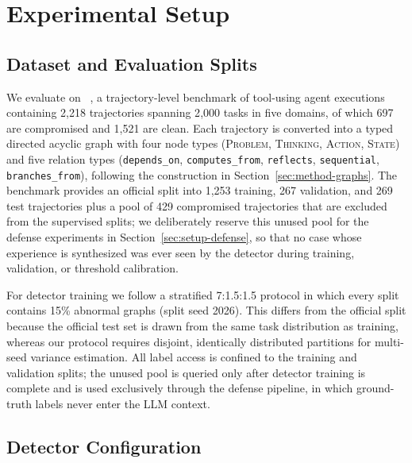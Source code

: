 \section{Experimental Setup}
\label{sec:setup}

\subsection{Dataset and Evaluation Splits}
\label{sec:setup-data}

We evaluate on \tool{}~\cite{ma2026autodojo}, a trajectory-level benchmark of tool-using agent executions containing 2{,}218 trajectories spanning 2{,}000 tasks in five domains, of which 697 are compromised and 1{,}521 are clean. Each trajectory is converted into a typed directed acyclic graph with four node types (\textsc{Problem}, \textsc{Thinking}, \textsc{Action}, \textsc{State}) and five relation types (\texttt{depends\_on}, \texttt{computes\_from}, \texttt{reflects}, \texttt{sequential}, \texttt{branches\_from}), following the construction in Section~\ref{sec:method-graphs}. The benchmark provides an official split into 1{,}253 training, 267 validation, and 269 test trajectories plus a pool of 429 compromised trajectories that are excluded from the supervised splits; we deliberately reserve this unused pool for the defense experiments in Section~\ref{sec:setup-defense}, so that no case whose experience is synthesized was ever seen by the detector during training, validation, or threshold calibration.

For detector training we follow a stratified 7:1.5:1.5 protocol in which every split contains 15\% abnormal graphs (split seed 2026). This differs from the official split because the official test set is drawn from the same task distribution as training, whereas our protocol requires disjoint, identically distributed partitions for multi-seed variance estimation. All label access is confined to the training and validation splits; the unused pool is queried only after detector training is complete and is used exclusively through the defense pipeline, in which ground-truth labels never enter the LLM context.

\subsection{Detector Configuration}
\label{sec:setup-detector}

